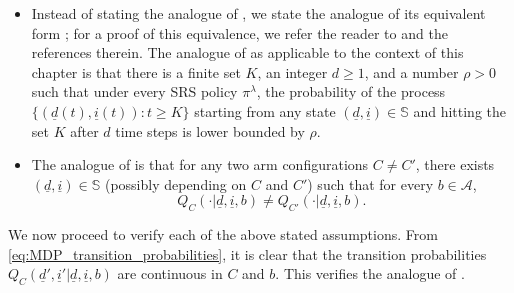 \begin{itemize}
	\item Instead of stating the analogue of \cite[Assumption A5]{borkar1982identification}, we state the analogue of its equivalent form \cite[Condition C2]{federgruen1978note}; for a proof of this equivalence, we refer the reader to \cite{federgruen1978note} and the references therein. The analogue of \cite[Condition C2]{federgruen1978note} as applicable to the context of this chapter is that there is a finite set $K$, an integer $d\geq 1$, and a number $\rho>0$ such that under every SRS policy $\pi^\lambda$, the probability of the process $\{(\underline{d}(t), \underline{i}(t)): t\geq K\}$ starting from any state $(\underline{d}, \underline{i})\in \mathbb{S}$ and hitting the set $K$ after $d$ time steps is lower bounded by $\rho$.
	\item The analogue of \cite[Assumption A6.1]{borkar1982identification} is that for any two arm configurations $C\neq C'$, there exists $(\underline{d}, \underline{i})\in \mathbb{S}$ (possibly depending on $C$ and $C'$) such that for every $b\in \mathcal{A}$, $$ Q_C(\cdot|\underline{d}, \underline{i}, b) \neq Q_{C'}(\cdot|\underline{d}, \underline{i}, b). $$
\end{itemize}

 We now proceed to verify each of the above stated assumptions. From \eqref{eq:MDP_transition_probabilities}, it is clear that the transition probabilities $Q_C(\underline{d}', \underline{i}'|\underline{d}, \underline{i}, b)$ are continuous in $C$ and $b$. This verifies the analogue of \cite[Assumption A1]{borkar1982identification}.

